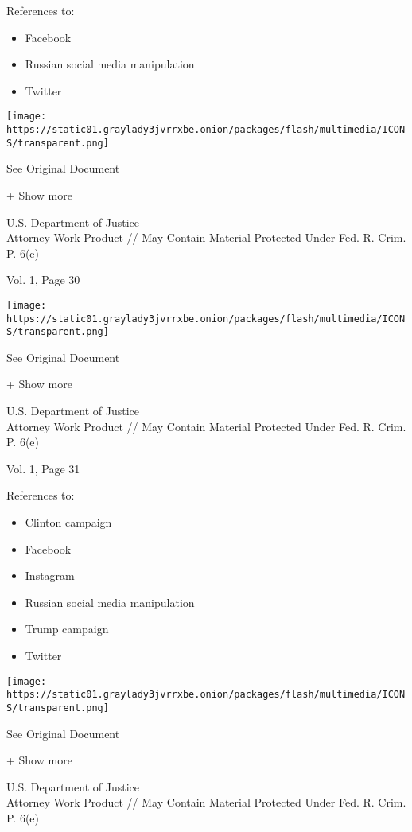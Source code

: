 References to:

\begin{itemize}
\tightlist
\item
  Facebook
\item
  Russian social media manipulation
\item
  Twitter
\end{itemize}

\protect\hyperlink{}{}

\texttt{[image: https://static01.graylady3jvrrxbe.onion/packages/flash/multimedia/ICONS/transparent.png]}

See Original Document

+ Show more

U.S. Department of Justice\\
Attorney Work Product // May Contain Material Protected Under Fed. R.
Crim. P. 6(e)

Vol. 1, Page 30

\protect\hyperlink{}{}

\texttt{[image: https://static01.graylady3jvrrxbe.onion/packages/flash/multimedia/ICONS/transparent.png]}

See Original Document

+ Show more

U.S. Department of Justice\\
Attorney Work Product // May Contain Material Protected Under Fed. R.
Crim. P. 6(e)

Vol. 1, Page 31

References to:

\begin{itemize}
\tightlist
\item
  Clinton campaign
\item
  Facebook
\item
  Instagram
\item
  Russian social media manipulation
\item
  Trump campaign
\item
  Twitter
\end{itemize}

\protect\hyperlink{}{}

\texttt{[image: https://static01.graylady3jvrrxbe.onion/packages/flash/multimedia/ICONS/transparent.png]}

See Original Document

+ Show more

U.S. Department of Justice\\
Attorney Work Product // May Contain Material Protected Under Fed. R.
Crim. P. 6(e)

